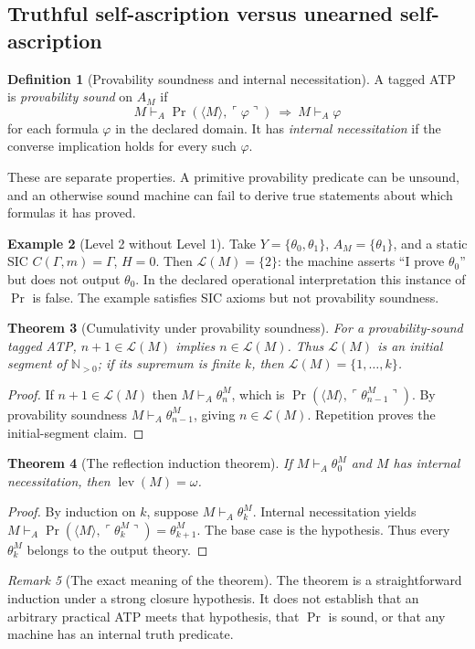 \documentclass[11pt,letterpaper]{article}
\newtheorem{theorem}{Theorem}[section]
\theoremstyle{definition}\newtheorem{definition}[theorem]{Definition}\newtheorem{example}[theorem]{Example}\newtheorem{protocol}[theorem]{Protocol}\newtheorem{question}[theorem]{Open Problem}
\theoremstyle{remark}\newtheorem{remark}[theorem]{Remark}
\newcommand{\N}{\mathbb N}\newcommand{\Pset}{\mathcal P}\newcommand{\Con}{\operatorname{Con}}
\newcommand{\lev}{\operatorname{lev}}
\newcommand{\Prov}{\operatorname{Pr}}
\newcommand{\Mtag}{\langle M\rangle}
\newcommand{\Nth}{\N_{>0}}
\newcommand{\qname}[1]{\ulcorner #1\urcorner}
\begin{document}
\subsection{Truthful self-ascription versus unearned self-ascription}
\begin{definition}[Provability soundness and internal necessitation]
A tagged ATP is \emph{provability sound} on $A_M$ if
\[
M\vdash_A\Prov(\Mtag,\qname{\varphi})\ \Longrightarrow\ M\vdash_A\varphi
\]
for each formula $\varphi$ in the declared domain. It has \emph{internal necessitation} if the converse implication holds for every such $\varphi$.
\end{definition}
These are separate properties. A primitive provability predicate can be unsound, and an otherwise sound machine can fail to derive true statements about which formulas it has proved.
\begin{example}[Level 2 without Level 1]
Take $Y=\{\theta_0,\theta_1\}$, $A_M=\{\theta_1\}$, and a static SIC $C(\Gamma,m)=\Gamma$, $H=0$. Then $\mathcal L(M)=\{2\}$: the machine asserts ``I prove $\theta_0$'' but does not output $\theta_0$. In the declared operational interpretation this instance of $\Prov$ is false. The example satisfies SIC axioms but not provability soundness.
\end{example}
\begin{theorem}[Cumulativity under provability soundness]\label{thm:cum}
For a provability-sound tagged ATP, $n+1\in\mathcal L(M)$ implies $n\in\mathcal L(M)$. Thus $\mathcal L(M)$ is an initial segment of $\Nth$; if its supremum is finite $k$, then $\mathcal L(M)=\{1,\dots,k\}$.
\end{theorem}
\begin{proof}
If $n+1\in\mathcal L(M)$ then $M\vdash_A\theta_n^M$, which is $\Prov(\Mtag,\qname{\theta_{n-1}^M})$. By provability soundness $M\vdash_A\theta_{n-1}^M$, giving $n\in\mathcal L(M)$. Repetition proves the initial-segment claim.
\end{proof}
\begin{theorem}[The reflection induction theorem]\label{thm:omega}
If $M\vdash_A\theta_0^M$ and $M$ has internal necessitation, then $\lev(M)=\omega$.
\end{theorem}
\begin{proof}
By induction on $k$, suppose $M\vdash_A\theta_k^M$. Internal necessitation yields $M\vdash_A\Prov(\Mtag,\qname{\theta_k^M})=\theta_{k+1}^M$. The base case is the hypothesis. Thus every $\theta_k^M$ belongs to the output theory.
\end{proof}
\begin{remark}[The exact meaning of the theorem]
The theorem is a straightforward induction under a strong closure hypothesis. It does not establish that an arbitrary practical ATP meets that hypothesis, that $\Prov$ is sound, or that any machine has an internal truth predicate.
\end{remark}
\end{document}
